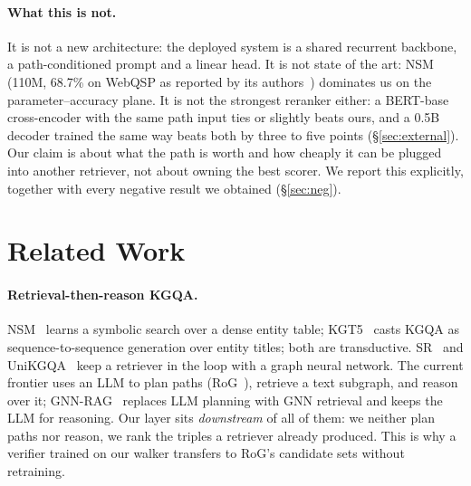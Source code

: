 \documentclass[sigconf,review,anonymous]{acmart}
\begin{document}
\paragraph{What this is not.}
It is not a new architecture: the deployed system is a shared recurrent backbone, a path-conditioned prompt and a linear head. It is not state of the art: NSM (110M, 68.7\% on WebQSP as reported by its authors~\cite{he2021nsm}) dominates us on the parameter--accuracy plane. It is not the strongest reranker either: a BERT-base cross-encoder with the same path input ties or slightly beats ours, and a 0.5B decoder trained the same way beats both by three to five points (\S\ref{sec:external}). Our claim is about what the path is worth and how cheaply it can be plugged into another retriever, not about owning the best scorer. We report this explicitly, together with every negative result we obtained (\S\ref{sec:neg}).

\section{Related Work}
\label{sec:related}

\paragraph{Retrieval-then-reason KGQA.}
NSM~\cite{he2021nsm} learns a symbolic search over a dense entity table; KGT5~\cite{saxena2022kgt5} casts KGQA as sequence-to-sequence generation over entity titles; both are transductive. SR~\cite{zhang2022sr} and UniKGQA~\cite{jiang2023unikgqa} keep a retriever in the loop with a graph neural network. The current frontier uses an LLM to plan paths (RoG~\cite{luo2024rog}), retrieve a text subgraph, and reason over it; GNN-RAG~\cite{mavromatis2024gnnrag} replaces LLM planning with GNN retrieval and keeps the LLM for reasoning. Our layer sits \emph{downstream} of all of them: we neither plan paths nor reason, we rank the triples a retriever already produced. This is why a verifier trained on our walker transfers to RoG's candidate sets without retraining.
\end{document}
